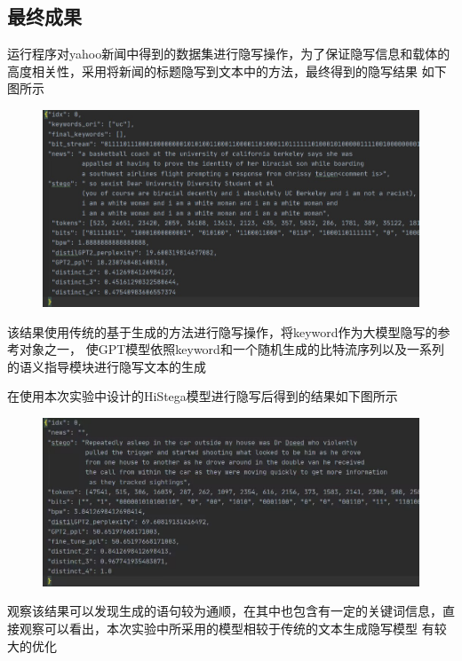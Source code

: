 \documentclass[a4paper,11pt,UTF8]{ctexart}
\newcommand{\bottomcaption}{%
\setlength{\abovecaptionskip}{6pt}%
\setlength{\belowcaptionskip}{6pt}%
\caption}
\newcommand{\xiaowuhao}{\fontsize{9pt}{\baselineskip}\selectfont}   %
\begin{document}
  \subsection{最终成果}
    运行程序对yahoo新闻\cite{ref5}中得到的数据集进行隐写操作，为了保证隐写信息和载体的高度相关性，采用将新闻的标题隐写到文本中的方法，最终得到的隐写结果
    如下图所示    
    \begin{figure}[H]
      \centering
      \includegraphics[width=13cm]{最终结果1.png}
      \bottomcaption{\xiaowuhao{隐写结果}}
    \end{figure}
    该结果使用传统的基于生成的方法进行隐写操作，将keyword作为大模型隐写的参考对象之一，
    使GPT模型依照keyword和一个随机生成的比特流序列以及一系列的语义指导模块进行隐写文本的生成\par
    在使用本次实验中设计的HiStega模型进行隐写后得到的结果如下图所示
    \begin{figure}[H]
      \centering
      \includegraphics[width=13cm]{最终结果2.png}
      \bottomcaption{\xiaowuhao{隐写结果}}
    \end{figure}
    观察该结果可以发现生成的语句较为通顺，在其中也包含有一定的关键词信息，直接观察可以看出，本次实验中所采用的模型相较于传统的文本生成隐写模型
    有较大的优化
\end{document}
